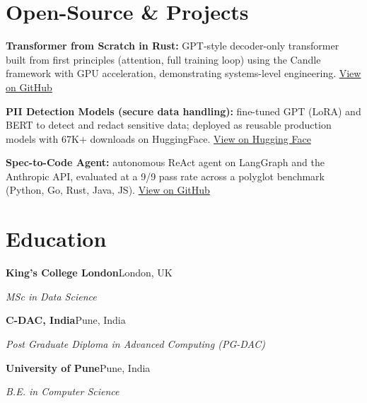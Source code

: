 \documentclass[10pt,a4paper]{article}
\begin{document}
\section{Open-Source \& Projects}
\begin{tight}
  \item \textbf{Transformer from Scratch in Rust:} GPT-style decoder-only transformer built from first principles (attention, full training loop) using the Candle framework with GPU acceleration, demonstrating systems-level engineering. \href{https://github.com/abhijeetscode/transformer-rust}{View on GitHub}
  \item \textbf{PII Detection Models (secure data handling):} fine-tuned GPT (LoRA) and BERT to detect and redact sensitive data; deployed as reusable production models with 67K+ downloads on HuggingFace. \href{https://huggingface.co/ab-ai/pii_model}{View on Hugging Face}
  \item \textbf{Spec-to-Code Agent:} autonomous ReAct agent on LangGraph and the Anthropic API, evaluated at a 9/9 pass rate across a polyglot benchmark (Python, Go, Rust, Java, JS). \href{https://github.com/abhijeetscode/Spec-to-Code-Agent}{View on GitHub}
\end{tight}

\section{Education}
{\color{company}\bfseries King's College London}\hfill {\color{muted}London, UK}\par
{\itshape MSc in Data Science}\par\vspace{2pt}
{\color{company}\bfseries C-DAC, India}\hfill {\color{muted}Pune, India}\par
{\itshape Post Graduate Diploma in Advanced Computing (PG-DAC)}\par\vspace{2pt}
{\color{company}\bfseries University of Pune}\hfill {\color{muted}Pune, India}\par
{\itshape B.E. in Computer Science}\par
\end{document}
